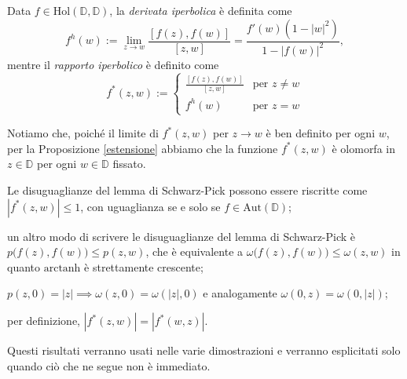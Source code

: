 \begin{defn}
  Data $f \in \text{Hol}(\mathbb{D},\mathbb{D})$, la \textit{derivata iperbolica} è definita come
  $$f^h(w):=\lim_{z \longrightarrow w} \frac{[f(z),f(w)]}{[z,w]}=\frac{f'(w)(1-|w|^2)}{1-|f(w)|^2},$$
  mentre il \textit{rapporto iperbolico} è definito come
  $$f^*(z,w):=\begin{cases}
    \frac{[f(z),f(w)]}{[z,w]} & \mbox{per }z\not=w \\
    f^h(w) & \mbox{per }z=w
  \end{cases}$$
\end{defn}

Notiamo che, poiché il limite di $f^*(z,w)$ per $z \longrightarrow w$ è ben definito per ogni $w$, per la Proposizione \ref{estensione} abbiamo che la funzione $f^*(z,w)$ è olomorfa in $z \in \mathbb{D}$ per ogni $w \in \mathbb{D}$ fissato.

\begin{oss} \label{oss1}
  \begin{nlist}
    \item Le disuguaglianze del lemma di Schwarz-Pick possono essere riscritte come $|f^*(z,w)| \le 1$, con uguaglianza se e solo se $f \in \text{Aut}(\mathbb{D})$;
    \item  un altro modo di scrivere le disuguaglianze del lemma di Schwarz-Pick è $p\bigl(f(z),f(w)\bigr) \le p(z,w)$, che è equivalente a $\omega\bigl(f(z),f(w)\bigr) \le \omega(z,w)$ in quanto $\text{arctanh}$ è strettamente crescente;
    \item $p(z,0)=|z| \implies \omega(z,0)=\omega(|z|,0)$ e analogamente $\omega(0,z)=\omega(0,|z|)$;
    \item per definizione, $|f^*(z,w)|=|f^*(w,z)|$.
  \end{nlist}
  Questi risultati verranno usati nelle varie dimostrazioni e verranno esplicitati solo quando ciò che ne segue non è immediato.
\end{oss}
